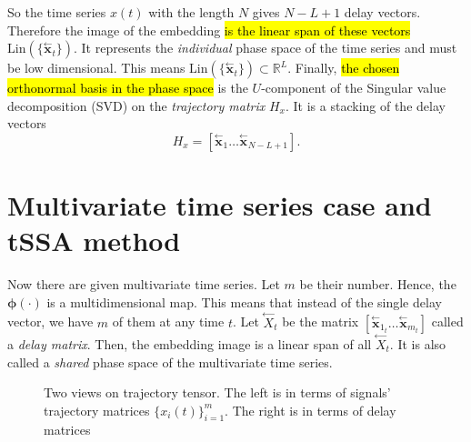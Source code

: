 \documentclass[referee, pdflatex, sn-mathphys-num]{sn-jnl}
\theoremstyle{definition}
\theoremstyle{plain}
\newcommand{\delayV}[1]{\overset{\leftarrow}{\mathbf{x}}_{#1}}
\newcommand{\delayM}[1]{\overset{\leftarrow}{X}_{#1}}
\begin{document}
	So the time series $ x(t) $ with the length $ N $ gives $ N - L + 1 $ delay vectors. Therefore the image of the embedding \hl{is the linear span of these vectors} $ \text{Lin}(\{\delayV{t}\}) $. It represents the \emph{individual} phase space of the time series and must be low dimensional. This means $ \text{Lin}(\{\delayV{t}\}) \subset \mathbb{R}^L $. Finally, \hl{the chosen orthonormal basis in the phase space} is the $ U $-component of the Singular value decomposition (SVD) on the \emph{trajectory matrix} $ H_x $. It is a stacking of the delay vectors	\[
		H_x = [ \delayV{1} \ldots  \delayV{N - L + 1}].
	\]
	
	\section{Multivariate time series case and tSSA method}\label{sec:tssa_method}
	
	Now there are given multivariate time series. Let $ m $ be their number. Hence, the $ \boldsymbol{\phi}(\cdot) $ is a multidimensional map. This means that instead of the single delay vector, we have $ m $ of them at any time $ t $. Let $ \delayM{t} $ be the matrix $ [ \delayV{1_t} \ldots \delayV{m_t} ] $ called a \emph{delay matrix}. Then, the embedding image is a linear span of all $ \delayM{t} $. It is also called a \emph{shared} phase space of the multivariate time series.
	
	\begin{figure}[!htbp]
		\centering
		
		\caption{Two views on trajectory tensor. The left is in terms of signals' trajectory matrices $ \{x_i(t)\}_{i=1}^m $. The right is in terms of delay matrices}\label{pic:traj_tensor}
	\end{figure}
	
\end{document}
